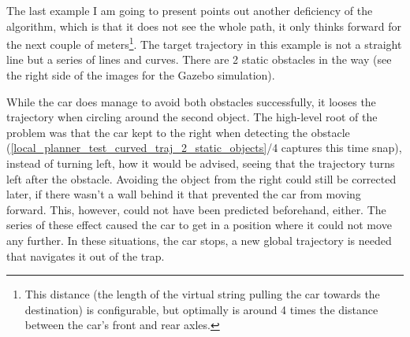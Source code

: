 The last example I am going to present points out another deficiency of the algorithm, which is that it does not see the whole path, it only thinks forward for the next couple of meters\footnote{This distance (the length of the virtual string pulling the car towards the destination) is configurable, but optimally is around 4 times the distance between the car's front and rear axles.}. The target trajectory in this example is not a straight line but a series of lines and curves. There are 2 static obstacles in the way (see the right side of the images for the Gazebo simulation).

While the car does manage to avoid both obstacles successfully, it looses the trajectory when circling around the second object. The high-level root of the problem was that the car kept to the right when detecting the obstacle (\ref{local_planner_test_curved_traj_2_static_objects}/4 captures this time snap), instead of turning left, how it would be advised, seeing that the trajectory turns left after the obstacle. Avoiding the object from the right could still be corrected later, if there wasn't a wall behind it that prevented the car from moving forward. This, however, could not have been predicted beforehand, either. The series of these effect caused the car to get in a position where it could not move any further. In these situations, the car stops, a new global trajectory is needed that navigates it out of the trap.

